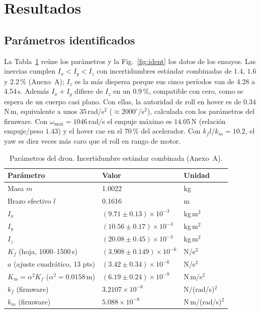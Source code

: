 \section{Resultados}
\label{sec:res}

\subsection{Parámetros identificados}
La Tabla~\ref{tab:par} reúne los parámetros y la Fig.~\ref{fig:ident} los datos de los ensayos. Las inercias cumplen $I_x<I_y<I_z$ con incertidumbres estándar combinadas de $1.4$, $1.6$ y $2.2$\,\% (Anexo~A); $I_z$ es la más dispersa porque sus cinco períodos van de 4.28 a 4.54\,s. Además $I_x+I_y$ difiere de $I_z$ en un $0.9$\,\%, compatible con cero, como se espera de un cuerpo casi plano. Con ellas, la autoridad de roll en hover es de $0.34$\,N\,m, equivalente a unos $35$\,rad/s$^2$ ($\approx2000^\circ$/s$^2$), calculada con los parámetros del firmware. Con $\omega_{\max}=1046$\,rad/s el empuje máximo es $14.05$\,N (relación empuje/peso $1.43$) y el hover cae en el $70$\,\% del acelerador. Con $k_fl/k_m=10.2$, el yaw es diez veces más caro que el roll en rango de motor.

\begin{table}[t]
\caption{Parámetros del dron. Incertidumbre estándar combinada (Anexo~A).}
\label{tab:par}
\centering\footnotesize\setlength{\tabcolsep}{3pt}
\begin{tabular}{@{}lll@{}}
\toprule
Parámetro & Valor & Unidad \\
\midrule
Masa $m$ & 1.0022 & kg \\
Brazo efectivo $l$ & 0.1616 & m \\
$I_x$ & $(9.71\pm0.13)\times10^{-3}$ & kg\,m$^2$ \\
$I_y$ & $(10.56\pm0.17)\times10^{-3}$ & kg\,m$^2$ \\
$I_z$ & $(20.08\pm0.45)\times10^{-3}$ & kg\,m$^2$ \\
$K_f$ (hoja, 1000--1500\,\textmu{}s) & $(3.908\pm0.149)\times10^{-6}$ & N/\textmu{}s$^2$ \\
$a$ (ajuste cuadrático, 13 pts) & $(3.42\pm0.34)\times10^{-6}$ & N/\textmu{}s$^2$ \\
$K_m=\alpha^2K_f$ ($\alpha^2=0.0158$\,m) & $(6.19\pm0.24)\times10^{-8}$ & N\,m/\textmu{}s$^2$ \\
$k_f$ (firmware) & $3.2107\times10^{-6}$ & N/(rad/s)$^2$ \\
$k_m$ (firmware) & $5.088\times10^{-8}$ & N\,m/(rad/s)$^2$ \\
\bottomrule
\end{tabular}
\end{table}

